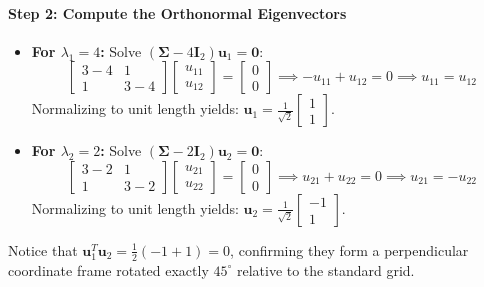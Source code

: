 \documentclass{article}
\begin{document}
\paragraph{Step 2: Compute the Orthonormal Eigenvectors}
\begin{itemize}
    \item \textbf{For $\lambda_1 = 4$:} Solve $(\boldsymbol{\Sigma} - 4\mathbf{I}_2)\mathbf{u}_1 = \mathbf{0}$:
    \begin{equation*}
    \begin{bmatrix} 3-4 & 1 \\ 1 & 3-4 \end{bmatrix} \begin{bmatrix} u_{11} \\ u_{12} \end{bmatrix} = \begin{bmatrix} 0 \\ 0 \end{bmatrix} \implies -u_{11} + u_{12} = 0 \implies u_{11} = u_{12}
    \end{equation*}
    Normalizing to unit length yields: $\mathbf{u}_1 = \frac{1}{\sqrt{2}}\begin{bmatrix} 1 \\ 1 \end{bmatrix}$.
    
    \item \textbf{For $\lambda_2 = 2$:} Solve $(\boldsymbol{\Sigma} - 2\mathbf{I}_2)\mathbf{u}_2 = \mathbf{0}$:
    \begin{equation*}
    \begin{bmatrix} 3-2 & 1 \\ 1 & 3-2 \end{bmatrix} \begin{bmatrix} u_{21} \\ u_{22} \end{bmatrix} = \begin{bmatrix} 0 \\ 0 \end{bmatrix} \implies u_{21} + u_{22} = 0 \implies u_{21} = -u_{22}
    \end{equation*}
    Normalizing to unit length yields: $\mathbf{u}_2 = \frac{1}{\sqrt{2}}\begin{bmatrix} -1 \\ 1 \end{bmatrix}$.
\end{itemize}

Notice that $\mathbf{u}_1^T \mathbf{u}_2 = \frac{1}{2}(-1 + 1) = 0$, confirming they form a perpendicular coordinate frame rotated exactly $45^\circ$ relative to the standard grid.
\end{document}
